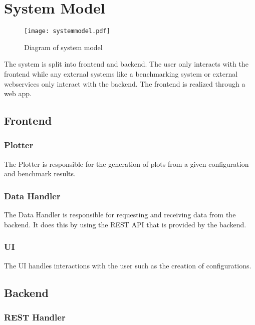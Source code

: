 \section{System Model}

\begin{figure}[H]
    \texttt{[image: systemmodel.pdf]}
    \caption{Diagram of system model}
    \label{fig:systemmodel}
\end{figure}

The system is split into frontend and backend. The user only interacts with the frontend while any external systems like a benchmarking system or external webservices only interact with the backend. The frontend is realized through a web app.

\subsection{Frontend}

\subsubsection*{Plotter}

The Plotter is responsible for the generation of \glspl{plot} from a given \gls{configuration} and \glspl{benchmark result}.

\subsubsection*{Data Handler}

The Data Handler is responsible for requesting and receiving data from the backend. It does this by using the \gls{REST API} that is provided by the backend.

\subsubsection*{UI}

The UI handles interactions with the user such as the creation of \glspl{configuration}.

\subsection{Backend}

\subsubsection*{REST Handler}


